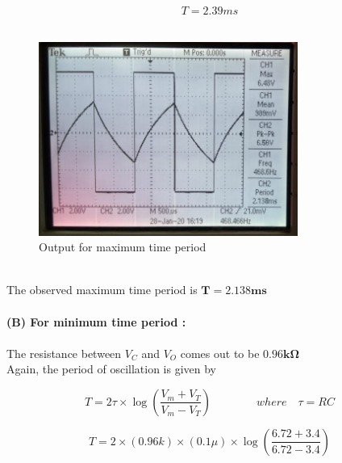\documentclass[12pt]{article}
\begin{document}
        \begin{equation}
            \boxed{T = 2.39ms}
        \end{equation}
        \\
        \begin{figure}[H]
            \centering
            \includegraphics[width = 0.6\linewidth, height = 2.5in]{reports/lab2/astable.jpeg}
            \caption{Output for maximum time period}
        \end{figure}
        \\
        The observed maximum time period is $\mathbf{T = 2.138ms}$\\
        \\
        \textbf{(B) For minimum time period :}\\
        \\
        The resistance between $V_C$ and $V_O$ comes out to be $\mathbf{0.96k \Omega}$
        \\
        Again, the period of oscillation is given by
        
        \begin{equation}
            T = 2\tau\times \log(\frac{V_m + V_T}{V_m - V_T}) \qquad \qquad where \quad \tau = RC
        \end{equation}
        
        \begin{equation}
            T = 2\times(0.96k)\times(0.1\mu)\times \log(\frac{6.72 + 3.4}{6.72 - 3.4})
        \end{equation}
        
\end{document}
